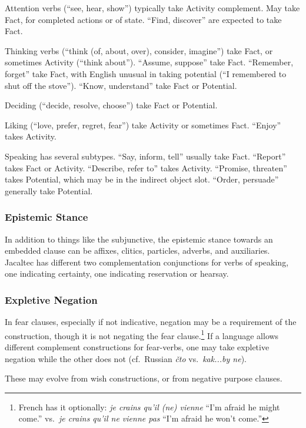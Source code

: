 \documentclass[11pt]{article}
\newcommand{\E}[1]{\textit{#1}}   %
\begin{document}
Attention verbs (``see, hear, show'') typically take Activity
complement.  May take Fact, for completed actions or of state.
``Find, discover'' are expected to take Fact.

Thinking verbs (``think (of, about, over), consider, imagine'') take
Fact, or sometimes Activity (``think about'').  ``Assume, suppose''
take Fact.  ``Remember, forget'' take Fact, with English unusual in
taking potential (``I remembered to shut off the stove'').  ``Know,
understand'' take Fact or Potential.

Deciding (``decide, resolve, choose'') take Fact or Potential.

Liking (``love, prefer, regret, fear'') take Activity or sometimes
Fact.  ``Enjoy'' takes Activity.

Speaking has several subtypes.  ``Say, inform, tell'' usually take
Fact.  ``Report'' takes Fact or Activity.  ``Describe, refer to''
takes Activity.  ``Promise, threaten'' takes Potential, which may be
in the indirect object slot.  ``Order, persuade'' generally take
Potential. 

\subsubsection{Epistemic Stance}
In addition to things like the subjunctive, the epistemic stance
towards an embedded clause can be affixes, clitics, particles,
adverbs, and auxiliaries.  Jacaltec has different two complementation
conjunctions for verbs of speaking, one indicating certainty, one
indicating reservation or hearsay.

\subsubsection{Expletive Negation}
In fear clauses, especially if not indicative, negation may be a
requirement of the construction, though it is not negating the fear
clause.\footnote{French has it optionally: \E{je crains qu'il (ne)
    vienne} ``I'm afraid he might come.'' vs.\ \E{je crains qu'il ne
    vienne pas} ``I'm afraid he won't come.''}  If a language allows
different complement constructions for fear-verbs, one may take
expletive negation while the other does not (cf.\ Russian \E{čto}
vs.\ \E{kak...by ne}).

These may evolve from wish constructions, or from negative
purpose clauses.
\end{document}

